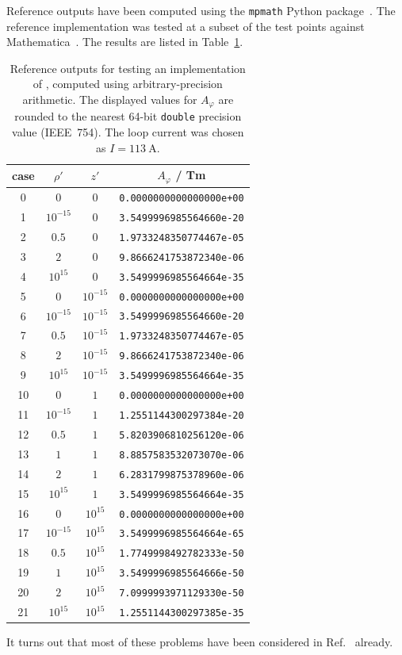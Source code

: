 Reference outputs have been computed using the \texttt{mpmath} Python package~\cite{mpmath}.
The reference implementation was tested at a subset of the test points against Mathematica~\cite{Mathematica}.
The results are listed in Table~\ref{tab:ref_cylWireLoop}.
\begin{table}[htbp]
  \centering
  \begin{tabular}{c|c|c|c}
    case & $\rho'$ & $z'$ & $A_\varphi$ / Tm \\
    \hline
     0 & $0$        & $0$        & \texttt{0.0000000000000000e+00} \\
     1 & $10^{-15}$ & $0$        & \texttt{3.5499996985564660e-20} \\
     2 & $0.5$      & $0$        & \texttt{1.9733248350774467e-05} \\
     3 & $2$        & $0$        & \texttt{9.8666241753872340e-06} \\
     4 & $10^{15}$  & $0$        & \texttt{3.5499996985564664e-35} \\
     5 & $0$        & $10^{-15}$ & \texttt{0.0000000000000000e+00} \\
     6 & $10^{-15}$ & $10^{-15}$ & \texttt{3.5499996985564660e-20} \\
     7 & $0.5$      & $10^{-15}$ & \texttt{1.9733248350774467e-05} \\
     8 & $2$        & $10^{-15}$ & \texttt{9.8666241753872340e-06} \\
     9 & $10^{15}$  & $10^{-15}$ & \texttt{3.5499996985564664e-35} \\
    10 & $0$        & $1$        & \texttt{0.0000000000000000e+00} \\
    11 & $10^{-15}$ & $1$        & \texttt{1.2551144300297384e-20} \\
    12 & $0.5$      & $1$        & \texttt{5.8203906810256120e-06} \\
    13 & $1$        & $1$        & \texttt{8.8857583532073070e-06} \\
    14 & $2$        & $1$        & \texttt{6.2831799875378960e-06} \\
    15 & $10^{15}$  & $1$        & \texttt{3.5499996985564664e-35} \\
    16 & $0$        & $10^{15}$  & \texttt{0.0000000000000000e+00} \\
    17 & $10^{-15}$ & $10^{15}$  & \texttt{3.5499996985564664e-65} \\
    18 & $0.5$      & $10^{15}$  & \texttt{1.7749998492782333e-50} \\
    19 & $1$        & $10^{15}$  & \texttt{3.5499996985564666e-50} \\
    20 & $2$        & $10^{15}$  & \texttt{7.0999993971129330e-50} \\
    21 & $10^{15}$  & $10^{15}$  & \texttt{1.2551144300297385e-35}
  \end{tabular}
  \caption{Reference outputs for testing an implementation of , computed using arbitrary-precision arithmetic.
           The displayed values for $A_\varphi$ are rounded to the nearest 64-bit \texttt{double} precision value (IEEE~754).
           The loop current was chosen as $I = \SI{113}{\ampere}$.}
  \label{tab:ref_cylWireLoop}
\end{table}

It turns out that most of these problems have been considered in Ref.~\cite{walstrom_2017} already.
